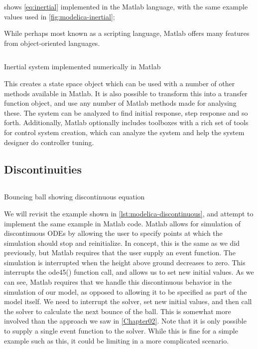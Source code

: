 \documentclass[\rootfolder/main.tex]{subfiles}
\begin{document}
 shows \cref{eq:inertial} implemented in the Matlab language, with the same example values used in \cref{fig:modelica-inertial};

While perhaps most known as a scripting language, Matlab offers many features from object-oriented languages.

\begin{listing}[ht]
    \inputminted{matlab}{\rootfolder/Models/Matlab/InertialMatlab.m}
    \caption{Inertial system implemented numerically in Matlab\label{lst:matlab-inertial}}
\end{listing}

This creates a state space object which can be used with a number of other methods available in Matlab.
It is also possible to transform this into a transfer function object, and use any number of Matlab methods made for analysing these.
The system can be analyzed to find initial response, step response and so forth.
Additionally, Matlab optionally includes toolboxes with a rich set of tools for control system creation, which can analyze the system and help the system designer do controller tuning.

\subsection{Discontinuities}

\begin{listing}[ht]
    \inputminted{matlab}{\rootfolder/Models/Matlab/BouncingBall.m}
    \caption{Bouncing ball showing discontinuous equation\label{lst:matlab-discontinuous}}
\end{listing}

We will revisit the example shown in \cref{lst:modelica-discontinuous}, and attempt to implement the same example in Matlab code.
Matlab allows for simulation of discontinuous ODEs by allowing the user to specify points at which the simulation should stop and reinitialize.
In concept, this is the same as we did previously, but Matlab requires that the user supply an event function.
The simulation is interrupted when the height above ground decreases to zero.
This interrupts the ode45() function call, and allows us to set new initial values.
As we can see, Matlab requires that we handle this discontinuous behavior in the simulation of our model, as opposed to allowing it to be specified as part of the model itself.
We need to interrupt the solver, set new initial values, and then call the solver to calculate the next bounce of the ball.
This is somewhat more involved than the approach we saw in \cref{Chapter02}.
Note that it is only possible to supply a single event function to the solver.
While this is fine for a simple example such as this, it could be limiting in a more complicated scenario.
\end{document}
